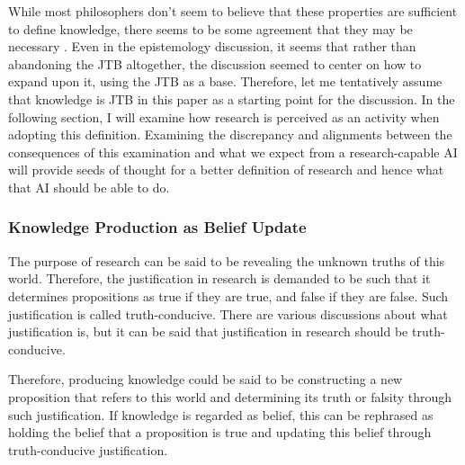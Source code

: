 While most philosophers don't seem to believe that these properties are sufficient to define knowledge, there seems to be some agreement that they may be necessary \cite{sep-epistemology}. Even in the epistemology discussion, it seems that rather than abandoning the JTB altogether, the discussion seemed to center on how to expand upon it, using the JTB as a base. Therefore, let me tentatively assume that knowledge is JTB in this paper as a starting point for the discussion. In the following section, I will examine how research is perceived as an activity when adopting this definition. Examining the discrepancy and alignments between the consequences of this examination and what we expect from a research-capable AI will provide seeds of thought for a better definition of research and hence what that AI should be able to do.

\subsubsection{Knowledge Production as Belief Update}
The purpose of research can be said to be revealing the unknown truths of this world. Therefore, the justification in research is demanded to be such that it determines propositions as true if they are true, and false if they are false. Such justification is called truth-conducive. There are various discussions about what justification is, but it can be said that justification in research should be truth-conducive.

Therefore, producing knowledge could be said to be constructing a new proposition that refers to this world and determining its truth or falsity through such justification. If knowledge is regarded as belief, this can be rephrased as holding the belief that a proposition is true and updating this belief through truth-conducive justification.




